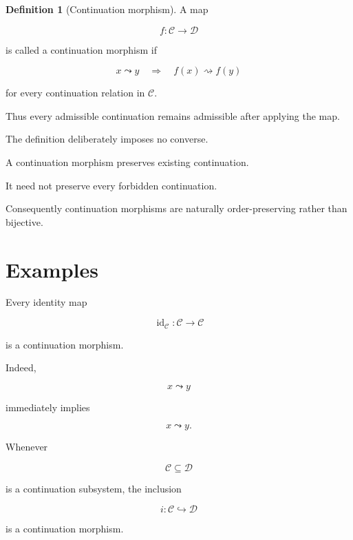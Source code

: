 \documentclass[13pt,openany]{book}
\theoremstyle{plain}
\theoremstyle{definition}
\newtheorem{definition}{Definition}[chapter]
\begin{document}
\begin{definition}[Continuation morphism]

A map

\[
f:\mathcal C\rightarrow\mathcal D
\]

is called a continuation morphism if

\[
x\leadsto y
\quad\Longrightarrow\quad
f(x)\rightsquigarrow f(y)
\]

for every continuation relation in
\(\mathcal C\).

\end{definition}

Thus every admissible continuation remains admissible after applying the map.


The definition deliberately imposes no converse.

A continuation morphism preserves existing continuation.

It need not preserve every forbidden continuation.

Consequently continuation morphisms are naturally order-preserving rather than
bijective.


\section{Examples}

Every identity map

\[
\operatorname{id}_{\mathcal C}
:
\mathcal C\rightarrow\mathcal C
\]

is a continuation morphism.

Indeed,

\[
x\leadsto y
\]

immediately implies

\[
x\leadsto y.
\]


Whenever

\[
\mathcal C
\subseteq
\mathcal D
\]

is a continuation subsystem, the inclusion

\[
i:\mathcal C\hookrightarrow\mathcal D
\]

is a continuation morphism.

\end{document}

